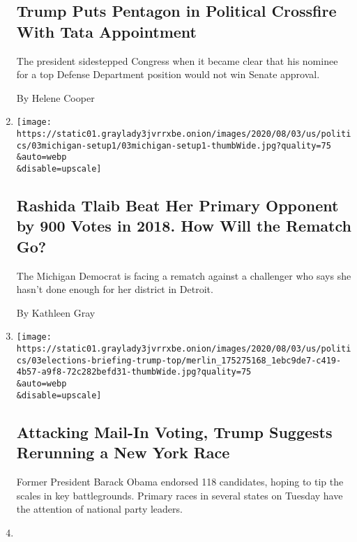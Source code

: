 \begin{enumerate}
{  \subsection{Trump Puts Pentagon in Political Crossfire With Tata
  Appointment}\label{trump-puts-pentagon-in-political-crossfire-with-tata-appointment}}

  The president sidestepped Congress when it became clear that his
  nominee for a top Defense Department position would not win Senate
  approval.

  By Helene Cooper
\item
  \href{/2020/08/03/us/politics/michigan-primary-rashida-tlaib-brenda-jones.html}{}

  \texttt{[image: https://static01.graylady3jvrrxbe.onion/images/2020/08/03/us/politics/03michigan-setup1/03michigan-setup1-thumbWide.jpg?quality=75\\\&auto=webp\\\&disable=upscale]}

  \hypertarget{rashida-tlaib-beat-her-primary-opponent-by-900-votes-in-2018-how-will-the-rematch-go}{%
  \subsection{Rashida Tlaib Beat Her Primary Opponent by 900 Votes in
  2018. How Will the Rematch
  Go?}\label{rashida-tlaib-beat-her-primary-opponent-by-900-votes-in-2018-how-will-the-rematch-go}}

  The Michigan Democrat is facing a rematch against a challenger who
  says she hasn't done enough for her district in Detroit.

  By Kathleen Gray
\item
  \href{/2020/08/03/us/elections/biden-vs-trump.html}{}

  \texttt{[image: https://static01.graylady3jvrrxbe.onion/images/2020/08/03/us/politics/03elections-briefing-trump-top/merlin\_175275168\_1ebc9de7-c419-4b57-a9f8-72c282befd31-thumbWide.jpg?quality=75\\\&auto=webp\\\&disable=upscale]}

  \hypertarget{attacking-mail-in-voting-trump-suggests-rerunning-a-new-york-race}{%
  \subsection{Attacking Mail-In Voting, Trump Suggests Rerunning a New
  York
  Race}\label{attacking-mail-in-voting-trump-suggests-rerunning-a-new-york-race}}

  Former President Barack Obama endorsed 118 candidates, hoping to tip
  the scales in key battlegrounds. Primary races in several states on
  Tuesday have the attention of national party leaders.
\item
  \href{/2020/08/03/us/politics/the-federalist-trump-liberals.html}{}


\end{enumerate}

